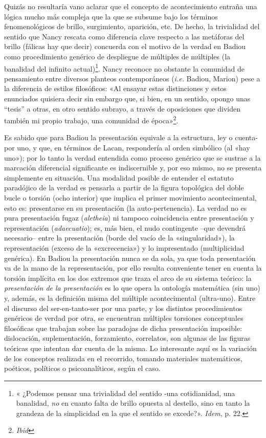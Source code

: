 Quizás no resultaría vano aclarar que el concepto de acontecimiento entraña una lógica mucho más compleja que la que se subsume bajo los términos fenomenológicos de brillo, surgimiento, aparición, etc. De hecho, la trivialidad del sentido que Nancy rescata como diferencia clave respecto a las metáforas del brillo (fálicas hay que decir) concuerda con el motivo de la verdad en Badiou como procedimiento genérico de despliegue de múltiples de múltiples (la banalidad del infinito actual)\footnote{« ¿Podemos pensar una trivialidad del sentido -una cotidianidad, una banalidad, \emph{no} en cuanto falta de brillo opuesta al destello, sino en tanto la grandeza de la simplicidad en la que el sentido se excede?». \emph{Idem}, p. 22.}. Nancy reconoce no obstante la comunidad de pensamiento entre diversos planteos contemporáneos (\emph{i.e.} Badiou, Marion) pese a la diferencia de estilos filosóficos: «Al ensayar estas distinciones y estos enunciados quisiera decir sin embargo que, si bien, en un sentido, opongo unas ``tesis'' a otras, en otro sentido subrayo, a través de oposiciones que dividen también mi propio trabajo, una comunidad de época»\footnote{\emph{Ibid}}.

Es sabido que para Badiou la presentación equivale a la estructura, ley o cuenta-por uno, y que, en términos de Lacan, respondería al orden simbólico (al «hay uno»); por lo tanto la verdad entendida como proceso genérico que se sustrae a la marcación diferencial significante es indiscernible y, por eso mismo, no se presenta simplemente en situación. Una modalidad posible de entender el estatuto paradójico de la verdad es pensarla a partir de la figura topológica del doble bucle o torsión (ocho interior) que implica el primer movimiento acontecimental, esto es: presentarse en su presentación (la auto-pertenencia). La verdad no es pura presentación fugaz (\emph{aletheia}) ni tampoco coincidencia entre presentación y representación (\emph{adaecuatio}); es, más bien, el nudo contingente --que devendrá necesario-- entre la presentación (borde del vacío de la «singularidad»), la representación (exceso de la «excrecencia») y lo impresentado (multiplicidad genérica). En Badiou la presentación nunca se da sola, ya que toda presentación va de la mano de la representación, por ello resulta conveniente tener en cuenta la torsión implícita en los dos extremos que traza el arco de su sistema teórico: la \emph{presentación de la presentación} es lo que opera la ontología matemática (sin uno) y, además, es la definición misma del múltiple acontecimental (ultra-uno). Entre el discurso del ser-en-tanto-ser por una parte, y los distintos procedimientos genéricos de verdad por otra, se encuentran múltiples torsiones conceptuales filosóficas que trabajan sobre las paradojas de dicha presentación imposible: dislocación, suplementación, forzamiento, correlatos, son algunas de las figuras teóricas que intentan dar cuenta de la misma. Lo interesante aquí es la variación de los conceptos realizada en el recorrido, tomando materiales matemáticos, poéticos, políticos o psicoanalíticos, según el caso.


